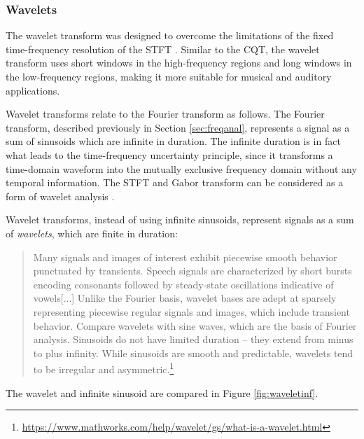 \documentclass[report.tex]{subfiles}
\begin{document}
\newpagefill

\subsubsection{Wavelets}
\label{sec:wavelets}

The wavelet transform was designed to overcome the limitations of the fixed time-frequency resolution of the STFT \parencite{wavelets1, wavelets2}. Similar to the CQT, the wavelet transform uses short windows in the high-frequency regions and long windows in the low-frequency regions, making it more suitable for musical and auditory applications.

Wavelet transforms relate to the Fourier transform as follows. The Fourier transform, described previously in Section \ref{sec:freqanal}, represents a signal as a sum of sinusoids which are infinite in duration. The infinite duration is in fact what leads to the time-frequency uncertainty principle, since it transforms a time-domain waveform into the mutually exclusive frequency domain without any temporal information. The STFT and Gabor transform can be considered as a form of wavelet analysis \parencite{gaborwavelet1, gaborwavelet2}.

Wavelet transforms, instead of using infinite sinusoids, represent signals as a sum of \textit{wavelets}, which are finite in duration:

\begin{quote}
	Many signals and images of interest exhibit piecewise smooth behavior punctuated by transients. Speech signals are characterized by short bursts encoding consonants followed by steady-state oscillations indicative of vowels[...] Unlike the Fourier basis, wavelet bases are adept at sparsely representing piecewise regular signals and images, which include transient behavior. Compare wavelets with sine waves, which are the basis of Fourier analysis. Sinusoids do not have limited duration -- they extend from minus to plus infinity. While sinusoids are smooth and predictable, wavelets tend to be irregular and asymmetric.\footnote{\url{https://www.mathworks.com/help/wavelet/gs/what-is-a-wavelet.html}}
\end{quote}

The wavelet and infinite sinusoid are compared in Figure \ref{fig:waveletinf}.
\end{document}
